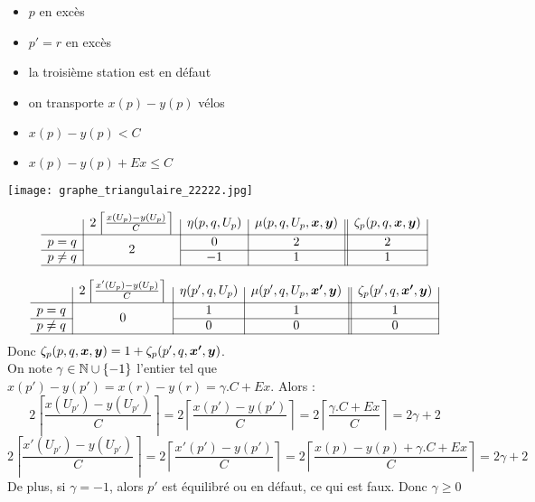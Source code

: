 \begin{minipage}{0.5\linewidth}
\begin{itemize}
\item $p$ en excès
\item $p'=r$ en excès
\item la troisième station est en défaut
\item on transporte $x(p)-y(p)$ vélos
\item $x(p)-y(p) < C$
\item $x(p) - y(p) + Ex \le C$
\end{itemize}
\end{minipage}
\begin{minipage}{0.5\linewidth}
\begin{center}
\texttt{[image: graphe\_triangulaire\_22222.jpg]}
\end{center}
\end{minipage}

\begin{gather*}
  \begin{array}{c|c|c|c||c|}
    & 2 \left\lceil \frac{x(U_p)-y(U_p)}{C} \right\rceil
    & \eta(p,q,U_p)
    & \mu(p,q,U_p,\bs{x},\bs{y})
    & \zeta_p(p,q,\bs{x},\bs{y})
    \\ \hline
    p=q
    & \multirow{2}{*}{$2$}
    & 0
    & 2
    & 2
    \\ \cline{1-1}\cline{3-5}
    p \ne q
    &
    & -1
    & 1
    & 1
    \\ \hline
  \end{array}
\end{gather*}

\begin{gather*}
  \begin{array}{c|c|c|c||c|}
    & 2 \left\lceil \frac{x'(U_p)-y(U_p)}{C} \right\rceil
    & \eta(p',q,U_p)
    & \mu(p',q,U_p,\bs{x'},\bs{y})
    & \zeta_p(p',q,\bs{x'},\bs{y})
    \\ \hline
    p=q
    & \multirow{2}{*}{$0$}
    & 1
    & 1
    & 1
    \\ \cline{1-1}\cline{3-5}
    p \ne q
    &
    & 0
    & 0
    & 0
    \\ \hline
  \end{array}
\end{gather*}
Donc $\zeta_p(p,q,\boldsymbol{x},\boldsymbol{y}) = 1 + \zeta_p(p',q,\boldsymbol{x'},\boldsymbol{y})$.
\\

On note $\gamma \in \mathbb{N} \cup \{-1\}$ l'entier tel que $x(p')-y(p') = x(r)-y(r) = \gamma. C + Ex$. Alors :
\[
2 \left\lceil \frac{x(U_{p'})-y(U_{p'})}{C} \right\rceil
= 2 \left\lceil \frac{x(p')-y(p')}{C} \right\rceil
= 2 \left\lceil \frac{\gamma. C + Ex}{C} \right\rceil
= 2\gamma + 2
\]
\[
2 \left\lceil \frac{x'(U_{p'})-y(U_{p'})}{C} \right\rceil
= 2 \left\lceil \frac{x'(p')-y(p')}{C} \right\rceil
= 2 \left\lceil \frac{x(p)-y(p)+\gamma. C + Ex}{C} \right\rceil
= 2\gamma + 2
\]
De plus, si $\gamma = -1$, alors $p'$ est équilibré ou en défaut, ce qui est faux. Donc $\gamma \ge 0$

